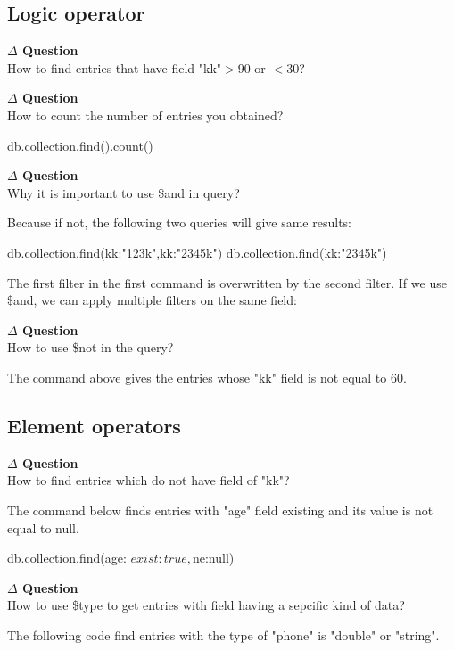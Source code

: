 \documentclass[12pt]{article}
\newenvironment{que}
    { \begin{mdframed}[backgroundcolor=green!20] \textbf{$\Delta$ Question} \\}
    {  \end{mdframed}}
\begin{document}
\subsection{Logic operator}
\begin{que}
How to find entries that have field "kk"$>$90 or $<$30?
\end{que}
\begin{que}
How to count the number of entries you obtained?
\end{que}
\begin{code}
db.collection.find().count()
\end{code}
\begin{que}
Why it is important to use \$and in query?
\end{que}
Because if not, the following two queries will give same results:
\begin{code}
db.collection.find({kk:"123k",kk:"2345k"})
db.collection.find({kk:"2345k"})
\end{code}
The first filter in the first command is overwritten by the second filter. If we use \$and, we can apply multiple filters on the same field:
\begin{que}
How to use \$not in the query?
\end{que}
The command above gives the entries whose "kk" field is not equal to 60.

\subsection{Element operators}
\begin{que}
How to find entries which do not have field of "kk"?
\end{que}
The command below finds entries with "age" field existing and its value is not equal to null.
\begin{code}
db.collection.find({age: {$exist: true, $ne:null}})
\end{code}
\begin{que}
How to use \$type to get entries with field having a sepcific kind of data?
\end{que}
The following code find entries with the type of "phone" is "double" or "string".
\end{document}
